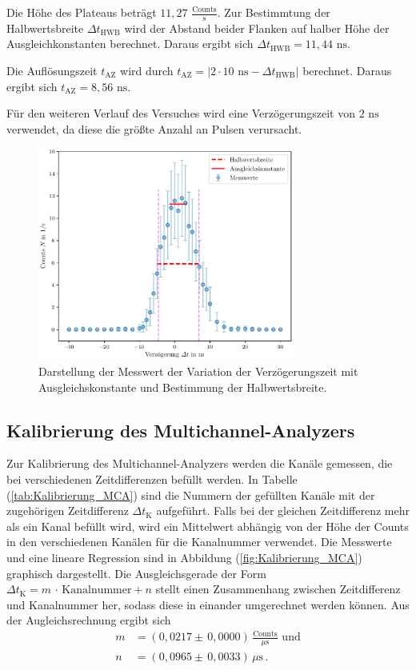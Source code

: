 Die Höhe des Plateaus beträgt $11,27 \,\, \frac{\text{Counts}}{\unit{\second}}$.
Zur Bestimmtung der Halbwertsbreite $\Delta t_{\text{HWB}}$ wird der Abstand 
beider Flanken auf halber Höhe der Ausgleichkonstanten berechnet.
Daraus ergibt sich $\Delta t_{\text{HWB}} = 11,44 \,\, \unit{\nano\second}$. 

Die Auflösungszeit $t_{\text{AZ}}$ wird durch  
$t_{\text{AZ}} = |2 \cdot 10 \,\, \unit{\nano\second}-\Delta t_{\text{HWB}}|$ berechnet.
Daraus ergibt sich $t_{\text{AZ}} = 8,56 \,\, \unit{\nano\second}$.

Für den weiteren Verlauf des Versuches wird eine Verzögerungszeit von $2 \,\,\unit{\nano\second}$ verwendet, da diese die 
größte Anzahl an Pulsen verursacht.
\begin{figure}
  \centering
  \includegraphics[width=0.75\textwidth]{Verzoegerung.pdf}
  \caption{Darstellung der Messwert der Variation der Verzögerungszeit mit Ausgleichskonstante und Bestimmung der Halbwertsbreite.}
  \label{fig:Verzoegerung}
\end{figure}
\FloatBarrier

\subsection{Kalibrierung des Multichannel-Analyzers}

Zur Kalibrierung des Multichannel-Analyzers werden die Kanäle 
gemessen, die bei verschiedenen Zeitdifferenzen befüllt werden. 
In Tabelle (\ref{tab:Kalibrierung_MCA}) sind die Nummern der
 gefüllten Kanäle mit der zugehörigen Zeitdifferenz 
 $\Delta t_{\text{K}}$ aufgeführt. Falls bei der gleichen Zeitdifferenz 
 mehr als ein Kanal befüllt wird, wird ein Mittelwert abhängig 
 von der Höhe der Counts in den verschiedenen Kanälen für 
 die Kanalnummer verwendet. Die Messwerte und eine lineare Regression 
 sind in Abbildung (\ref{fig:Kalibrierung_MCA}) graphisch dargestellt. 
 Die Ausgleichsgerade der Form $\Delta t_{\text{K}} = m \, \cdot \,\text{Kanalnummer} + n$
 stellt einen Zusammenhang zwischen Zeitdifferenz und Kanalnummer her, 
 sodass diese in einander umgerechnet werden können. 
 Aus der Augleichsrechnung ergibt sich 
 \begin{align}
 m &= (0,0217 \pm \, 0,0000) \, \frac{\text{Counts}}{\unit{\mu\second}}\, \, \text{und} \\
 n &= (0,0965 \pm \, 0,0033) \, \unit{\mu\second} \,. 
 \end{align}

